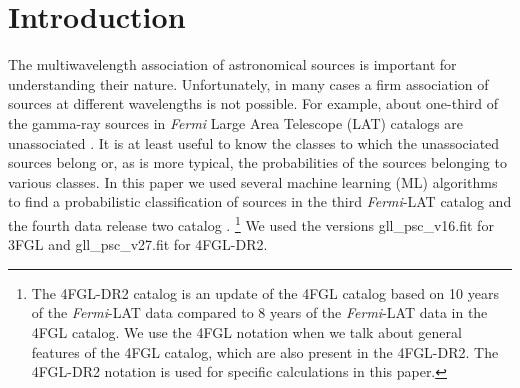 \documentclass[referee]{aa} %
\newcommand{\Fermi}{\textit{Fermi}\xspace}
\begin{document}

\maketitle


\section{Introduction}

The multiwavelength association of astronomical sources is important for understanding their nature.
Unfortunately, in many cases a firm association of sources at different wavelengths is not possible.
For example, about one-third of the gamma-ray sources in \Fermi Large Area Telescope (LAT) catalogs are unassociated
\citep{2010ApJS..188..405A, 2012ApJS..199...31N, 2015ApJS..218...23A, 2020ApJS..247...33A}.
It is at least useful to know the classes to which the unassociated sources belong or, as is more typical,
the probabilities of the sources belonging to various classes.
In this paper we used several machine learning (ML) algorithms to find a probabilistic classification of
 sources in the third \Fermi-LAT catalog \citep[3FGL;][]{2015ApJS..218...23A} and the fourth data release two catalog
\citep[4FGL-DR2;][]{2020ApJS..247...33A, 2020arXiv200511208B}.%
\footnote{The 4FGL-DR2 catalog \citep{2020arXiv200511208B} is an update of the 4FGL catalog \citep{2020ApJS..247...33A}
based on 10 years of the \Fermi-LAT data compared to 8 years of the \Fermi-LAT data in the 4FGL catalog.
We use the 4FGL notation when we talk about general features of the 4FGL catalog, which are also present in the 4FGL-DR2.
The 4FGL-DR2 notation is used for specific calculations in this paper.}
We used the versions gll\_psc\_v16.fit for 3FGL and gll\_psc\_v27.fit for 4FGL-DR2.
\end{document}
